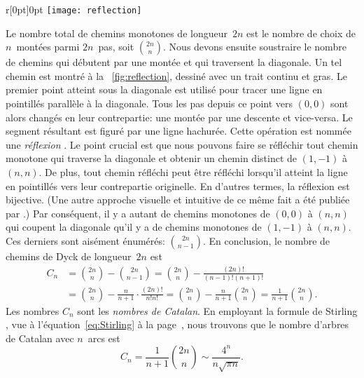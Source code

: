 \begin{wrapfigure}[14]{r}[0pt]{0pt}
\centering
\texttt{[image: reflection]}
\caption{Réflexion d'un préfixe par rapport à \(y = x - 1\)}
\label{fig:reflection}
\end{wrapfigure}
Le nombre total de chemins monotones de longueur~\(2n\) est le nombre
de choix de \(n\)~montées parmi \(2n\)~pas, soit
\(\binom{2n}{n}\). Nous devons ensuite soustraire le nombre de chemins
qui débutent par une montée et qui traversent la diagonale. Un tel
chemin est montré à la \fig~\ref{fig:reflection}, dessiné avec un
trait continu et gras. Le premier point atteint sous la diagonale est
utilisé pour tracer une ligne en pointillés parallèle à la
diagonale. Tous les pas depuis ce point vers \((0,0)\) sont alors
changés en leur contrepartie: une montée par une descente et
vice-versa. Le segment résultant est figuré par une ligne
hachurée. Cette opération est nommée une \emph{réflexion}
\citep{Renault_2008}. Le point crucial est que nous pouvons faire se
réfléchir tout chemin monotone qui traverse la diagonale et obtenir un
chemin distinct de \((1,-1)\) à \((n,n)\). De plus, tout chemin
réfléchi peut être réfléchi lorsqu'il atteint la ligne en pointillés
vers leur contrepartie originelle. En d'autres termes, la réflexion
est bijective. (Une autre approche visuelle et intuitive de ce même
fait a été publiée par \cite{Callan_1995}.) Par conséquent, il y a
autant de chemins monotones de \((0,0)\) à \((n,n)\) qui coupent la
diagonale qu'il y a de chemins monotones de \((1,-1)\) à \((n,n)\). Ces derniers sont aisément énumérés: \(\binom{2n}{n-1}\). En conclusion, le nombre de chemins de Dyck de longueur~\(2n\)
est\label{eq:Ann}
\begin{align*}
C_n &= \binom{2n}{n} - \binom{2n}{n-1}
= \binom{2n}{n} - \frac{(2n)!}{(n-1)!(n+1)!}\\
&= \binom{2n}{n} - \frac{n}{n+1} \cdot \frac{(2n)!}{n!n!}
 = \binom{2n}{n} - \frac{n}{n+1} \binom{2n}{n} = \frac{1}{n+1}\binom{2n}{n}.
\end{align*}
Les nombres \(C_n\) sont les \emph{nombres de Catalan}.
En employant la formule de Stirling , vue à
l'équation~\eqref{eq:Stirling} à la page~\pageref{eq:Stirling}, nous trouvons que le nombre d'arbres de Catalan avec \(n\)~arcs est
\begin{equation}
  C_n = \frac{1}{n+1}\binom{2n}{n} \sim \frac{4^n}{n\sqrt{\pi n}}.
\label{eq:Cn}
\end{equation}

